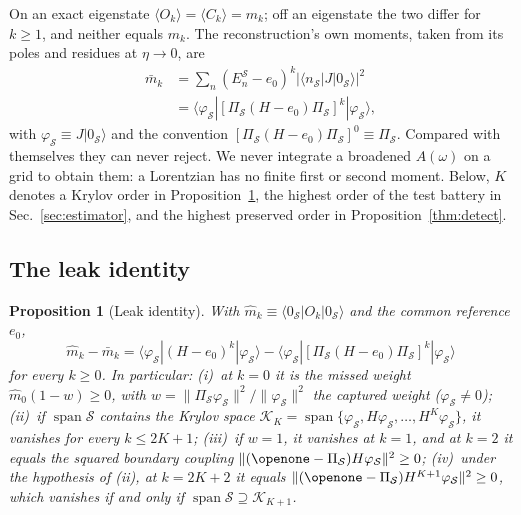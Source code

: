 \documentclass[aps,prb,reprint,onecolumn,12pt,superscriptaddress,longbibliography,floatfix]{revtex4-2}
\newtheorem{proposition}{Proposition}
\begin{document}
On an exact eigenstate $\langle O_k\rangle=\langle C_k\rangle=m_k$; off an eigenstate the two differ for $k\ge1$, and neither equals $m_k$. The reconstruction's own moments, taken from its poles and residues at $\eta\to0$, are
\begin{equation}
\begin{split}
\bar m_k&=\sum_n(E_n^\mathcal S-e_0)^k|\langle n_\mathcal S|J|0_\mathcal S\rangle|^2\\
&=\langle\varphi_\mathcal S|[\Pi_\mathcal S(H-e_0)\Pi_\mathcal S]^k|\varphi_\mathcal S\rangle,
\end{split}
\label{eq:recon}
\end{equation}
with $\varphi_\mathcal S\equiv J|0_\mathcal S\rangle$ and the convention $[\Pi_\mathcal S(H-e_0)\Pi_\mathcal S]^0\equiv\Pi_\mathcal S$. Compared with themselves they can never reject. We never integrate a broadened $A(\omega)$ on a grid to obtain them: a Lorentzian has no finite first or second moment. Below, $K$ denotes a Krylov order in Proposition~\ref{prop:leak}, the highest order of the test battery in Sec.~\ref{sec:estimator}, and the highest preserved order in Proposition~\ref{thm:detect}.

\subsection{The leak identity}
\label{sec:leak}
\begin{proposition}[Leak identity]
\label{prop:leak}
With $\widehat m_k\equiv\langle 0_\mathcal S|O_k|0_\mathcal S\rangle$ and the common reference $e_0$,
\begin{equation}
\widehat{m}_k-\bar m_k=\langle\varphi_\mathcal{S}|(H-e_0)^k|\varphi_\mathcal{S}\rangle-\langle\varphi_\mathcal{S}|[\Pi_\mathcal{S}(H-e_0)\Pi_\mathcal{S}]^{k}|\varphi_\mathcal{S}\rangle
\label{eq:app-leak}
\end{equation}
for every $k\ge0$. In particular:
(i)~at $k=0$ it is the missed weight $\widehat m_0(1-w)\ge0$, with $w=\|\Pi_\mathcal S\varphi_\mathcal S\|^2/\|\varphi_\mathcal S\|^2$ the captured weight ($\varphi_\mathcal S\neq0$);
(ii)~if $\operatorname{span}\mathcal S$ contains the Krylov space $\mathcal K_K=\operatorname{span}\{\varphi_\mathcal S,H\varphi_\mathcal S,\dots,H^K\varphi_\mathcal S\}$, it vanishes for every $k\le2K+1$;
(iii)~if $w=1$, it vanishes at $k=1$, and at $k=2$ it equals the squared boundary coupling $\|(\openone-\Pi_\mathcal{S})H\varphi_\mathcal{S}\|^2\ge0$;
(iv)~under the hypothesis of (ii), at $k=2K+2$ it equals $\|(\openone-\Pi_\mathcal S)H^{K+1}\varphi_\mathcal S\|^2\ge0$, which vanishes if and only if $\operatorname{span}\mathcal S\supseteq\mathcal K_{K+1}$.
\end{proposition}
\end{document}
